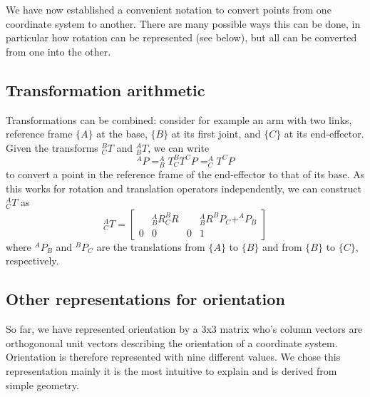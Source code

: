 We have now established a convenient notation to convert points from one coordinate system to another. There are many possible ways this can be done, in particular how rotation can be represented (see below), but all can be converted from one into the other. 

\subsection{Transformation arithmetic}
Transformations can be combined: consider for example an arm with two links, reference frame $\{A\}$ at the base, $ \{B\} $ at its first joint, and $\{C\}$ at its end-effector. Given the transforms $ ^B_CT$ and $ ^A_BT$, we can write
\begin{equation}
^AP=^A_BT^B_CT^CP=^A_CT^CP
\end{equation}
to convert a point in the reference frame of the end-effector to that of its base. As this works for rotation and translation operators independently, we can construct $ ^A_CT$ as
\begin{equation}
^A_CT=\left[\begin{array}{ccc|c} & ^A_BR^B_CR & & ^A_BR^BP_C +^AP_B \\\hline 0 & 0 & 0 & 1\end{array}\right]
\end{equation}
%
where $ ^AP_B$ and $ ^BP_C$ are the translations from $\{A\}$ to $\{B\}$ and from $ \{B\}$ to $\{C\}$, respectively.

\subsection{Other representations for orientation}
So far, we have represented orientation by a 3x3 matrix who's column vectors are orthogononal  unit vectors describing the orientation of a coordinate system. Orientation is therefore represented with nine different values. We chose this representation mainly it is the most intuitive to explain and is derived from simple geometry.

